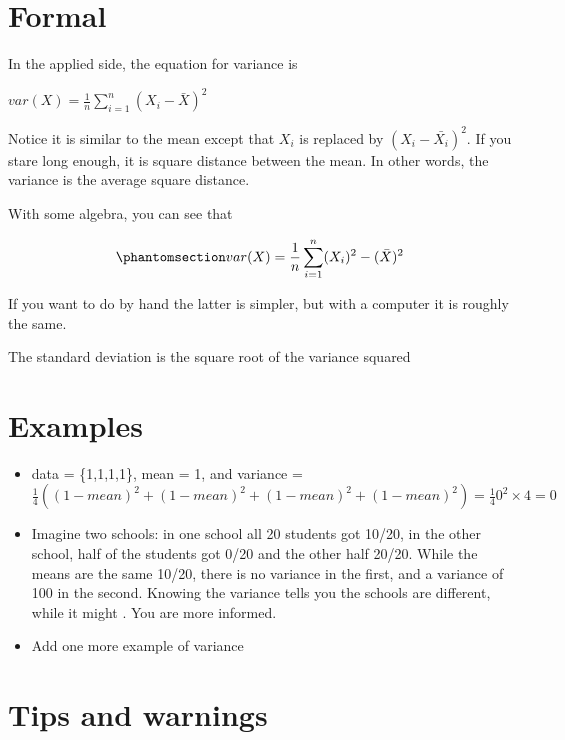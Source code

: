 \documentclass[
  letterpaper,
  DIV=11,
  numbers=noendperiod]{scrreprt}
\begin{document}
\section*{Formal}\label{formal-22}


In the applied side, the equation for variance is

\(var(X) = \frac{1}{n} \sum_{i=1}^{n} (X_i - \bar{X})^2\)

Notice it is similar to the mean except that \(X_i\) is replaced by
\((X_i - \bar{X_i})^2\). If you stare long enough, it is square distance
between the mean. In other words, the variance is the average square
distance.

With some algebra, you can see that

\begin{equation}\protect\phantomsection\label{eq-varB}{
  var(X) = \frac{1}{n} \sum_{i=1}^{n} (X_i)^2 - (\bar{X})^2
}\end{equation}

If you want to do by hand the latter is simpler, but with a computer it
is roughly the same.

The standard deviation is the square root of the variance squared

\section*{Examples}\label{examples-21}


\begin{itemize}
\item
  data = \{1,1,1,1\}, mean = 1, and variance =
  \(\frac{1}{4}\left((1 - mean)^2 + (1 - mean)^2 + (1 - mean)^2 +(1 - mean)^2 \right) = \frac{1}{4} 0^2 \times 4 = 0\)
\item
  Imagine two schools: in one school all 20 students got 10/20, in the
  other school, half of the students got 0/20 and the other half 20/20.
  While the means are the same 10/20, there is no variance in the first,
  and a variance of 100 in the second. Knowing the variance tells you
  the schools are different, while it might . You are more informed.
\item
  Add one more example of variance
\end{itemize}

\section*{Tips and warnings}\label{tips-and-warnings-15}
\end{document}
